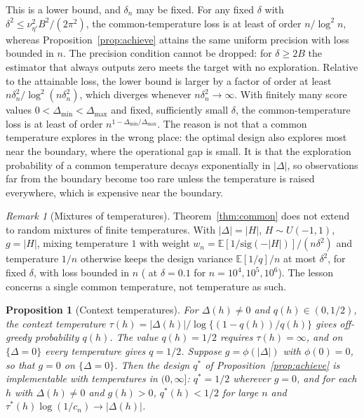 \documentclass[12pt]{article}
\newtheorem{proposition}{Proposition}
\theoremstyle{definition}
\theoremstyle{remark}
\newtheorem{remark}{Remark}
\newcommand{\E}{\mathbb{E}}
\newcommand{\sgm}{\mathrm{sig}}
\begin{document}
This is a lower bound, and $\delta_n$ may be fixed. For any fixed $\delta$ with
$\delta^2\le\nu_{\eta'}^2B^2/(2\pi^2)$, the common-temperature loss is at least of
order $n/\log^2 n$, whereas Proposition~\ref{prop:achieve} attains the same
uniform precision with loss bounded in $n$. The precision condition cannot be
dropped: for $\delta\ge2B$ the estimator that always outputs zero meets the
target with no exploration. Relative to the attainable loss, the lower bound is
larger by a factor of order at least $n\delta_n^2/\log^2(n\delta_n^2)$, which
diverges whenever $n\delta_n^2\to\infty$. With finitely many score values
$0<\Delta_{\min}<\Delta_{\max}$ and fixed, sufficiently small $\delta$, the
common-temperature loss is at least of order $n^{1-\Delta_{\min}/\Delta_{\max}}$. The reason is not that a
common temperature explores in the wrong place: the optimal design also
explores most near the boundary, where the operational gap is small. It is that the
exploration probability of a common temperature decays exponentially in
$|\Delta|$, so observations far from the boundary become too rare unless the
temperature is raised everywhere, which is expensive near the boundary.

\begin{remark}[Mixtures of temperatures]\label{rem:mixture}
Theorem~\ref{thm:common} does not extend to random mixtures of finite
temperatures. With $|\Delta|=|H|$, $H\sim U(-1,1)$, $g=|H|$, mixing
temperature $1$ with weight $w_n=\E[1/\sgm(-|H|)]/(n\delta^2)$ and temperature
$1/n$ otherwise keeps the design variance $\E[1/q]/n$ at most $\delta^2$, for
fixed $\delta$, with loss bounded in $n$
(\mixtureCost{} at $\delta=0.1$ for $n=10^4,10^5,10^6$). The lesson concerns a
single common temperature, not temperature as such.
\end{remark}

\begin{proposition}[Context temperatures]\label{prop:ctx}
For $\Delta(h)\neq0$ and $q(h)\in(0,1/2)$, the context temperature
$\tau(h)=|\Delta(h)|/\log\{(1-q(h))/q(h)\}$ gives off-greedy probability
$q(h)$. The value $q(h)=1/2$ requires $\tau(h)=\infty$, and on $\{\Delta=0\}$ every
temperature gives $q=1/2$. Suppose $g=\phi(|\Delta|)$ with $\phi(0)=0$, so that
$g=0$ on $\{\Delta=0\}$. Then the design $q^*$ of
Proposition~\ref{prop:achieve} is implementable with temperatures in
$(0,\infty]$: $q^*=1/2$ wherever $g=0$, and for each $h$ with $\Delta(h)\neq0$
and $g(h)>0$, $q^*(h)<1/2$ for large $n$ and $\tau^*(h)\log(1/c_n)\to|\Delta(h)|$.
\end{proposition}
\end{document}
